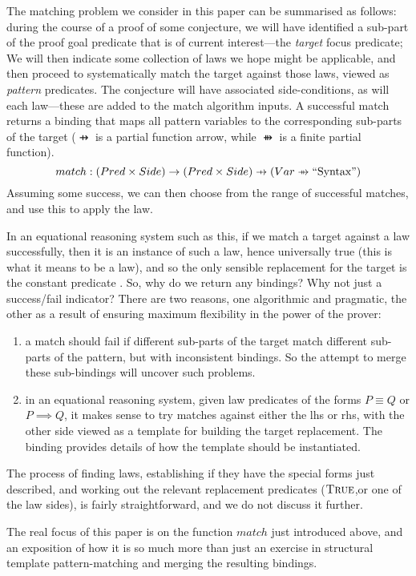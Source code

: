 The matching problem we consider in this paper can be summarised as follows:
during the course of a proof of some conjecture, we will have identified a sub-part
of the proof goal predicate that is of current interest---the \emph{target} focus predicate;
We will then indicate some collection of laws we hope might be applicable,
and then proceed to systematically match the target against those laws,
viewed as \emph{pattern} predicates.
The conjecture will have associated side-conditions,
as will each law---these are added to the match algorithm inputs.
A successful match returns a binding that maps all pattern variables
to the corresponding sub-parts of the target
($\pfun$ is a partial function arrow, while $\ffun$ is a finite partial function).
\[
match : (Pred\times Side) \fun (Pred\times Side) \pfun (Var \ffun \mbox{``Syntax''})
\]
Assuming some success, we can then choose from the range of successful matches,
and use this to apply the law.

In an equational reasoning system such as this, if we match a target
against a law successfully, then it is an instance of such a law,
hence universally true (this is what it means to be a law),
and so the only sensible replacement for the target is the constant predicate \True.
So, why do we return any bindings? Why not just a success/fail indicator?
There are two reasons, one algorithmic and pragmatic,
the other as a result of ensuring maximum flexibility
in the power of the prover:
\begin{enumerate}
  \item a match should fail if different sub-parts of the target
     match different sub-parts of the pattern, but with inconsistent bindings.
     So the attempt to merge these sub-bindings will uncover such problems.
  \item in an equational reasoning system, given law predicates of the
  forms $P \equiv Q$ or $P \implies Q$,
  it makes sense to try matches against either the lhs or rhs,
  with the other side viewed as a template for building the target replacement.
  The binding provides details of how the template should be instantiated.
\end{enumerate}
The process of
finding laws,
establishing if they have the special forms
just described,
 and working out the relevant replacement predicates
($\textsc{True}$,or one of the law sides),
is fairly straightforward, and we do not discuss it further.

The real focus of this paper is on the function $match$ just introduced
above, and an exposition of how it is so much more than just an exercise
in structural template pattern-matching and merging the resulting bindings.


